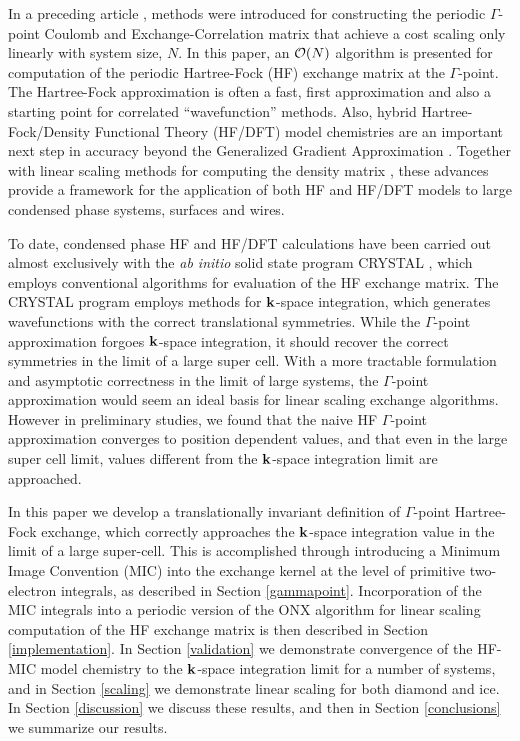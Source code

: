 \commentoutA{\documentclass[prb,aps,nobibnotes,twocolumn,doublespace,twocolumngrid,superbib,showpacs]{revtex4}}
\begin{document}
In a preceding article \cite{CTymczak04A},  methods were introduced for constructing 
the periodic $\Gamma$-point Coulomb and Exchange-Correlation matrix that 
achieve  a cost  scaling only linearly with system size, $N$.  In this paper, an ${\cal O}(N)$
algorithm is presented for computation of the periodic Hartree-Fock (HF) exchange matrix at the 
$\Gamma$-point.   The Hartree-Fock approximation is often a fast, first 
approximation and also a starting point for correlated ``wavefunction'' methods.  
Also, hybrid Hartree-Fock/Density Functional Theory (HF/DFT) model chemistries are an important next 
step in accuracy beyond the Generalized Gradient Approximation \cite{Gill92,Becke93,VBarone96,CAdamo99}.
Together with linear scaling methods for computing the density matrix \cite{ANiklasson02A,ANiklasson03}, these 
advances provide a framework for the application of both HF and HF/DFT models to large condensed 
phase systems, surfaces and wires.   

To date, condensed phase HF and HF/DFT calculations have been carried out almost 
exclusively with the {\em ab initio} solid state program {\sc CRYSTAL} \cite{RDovesi00,KDoll01}, 
which employs conventional  algorithms for evaluation of the 
HF exchange matrix.  The {\sc CRYSTAL} program employs methods for ${\bf k}$-space integration, 
which generates wavefunctions with the correct translational symmetries.   While the  
$\Gamma$-point approximation forgoes ${\bf k}$-space integration, it should recover the correct 
symmetries in the limit of a large super cell.  With a more tractable formulation and asymptotic 
correctness in the limit of large systems,  the $\Gamma$-point  approximation would seem an 
ideal basis for linear scaling exchange algorithms.   However in preliminary studies, we found 
that the naive HF $\Gamma$-point approximation converges to position dependent values, and that 
even in the large super cell limit,  values different from the ${\bf k}$-space integration limit 
are approached.

In this paper we develop a translationally invariant definition of $\Gamma$-point 
Hartree-Fock exchange, which correctly approaches the ${\bf k}$-space integration value
in the limit of a large super-cell.  This is accomplished through introducing a Minimum 
Image Convention (MIC) into the exchange kernel at the level of primitive two-electron integrals,  
as described in Section \ref{gammapoint}.  Incorporation of the MIC integrals into a periodic 
version of the {\sc ONX} algorithm \cite{ESchwegler97} for linear scaling computation of the HF 
exchange matrix is then described in Section \ref{implementation}.  In Section \ref{validation} 
we demonstrate convergence of the HF-MIC model chemistry to the ${\bf k}$-space integration 
limit for a number of systems, and in Section \ref{scaling} we demonstrate linear scaling 
for both diamond and ice.  In Section \ref{discussion} we discuss these results,
and then in Section \ref{conclusions} we summarize our results.
\end{document}
